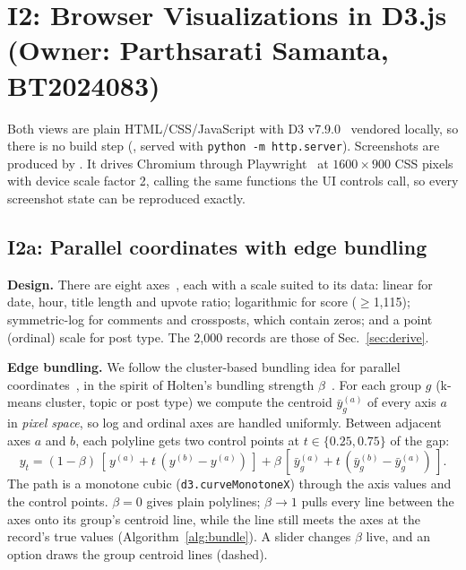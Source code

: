 \section{I2: Browser Visualizations in D3.js (Owner: Parthsarati Samanta, BT2024083)}
\label{sec:i2}
Both views are plain HTML/CSS/JavaScript with D3 v7.9.0~\cite{bostock2011} vendored locally, so there is no build step
(, served with \texttt{python -m http.server}). Screenshots are produced by
. It drives Chromium through Playwright~\cite{playwright} at $1600\times900$ CSS pixels with device
scale factor 2, calling the same functions the UI controls call, so every screenshot state can be reproduced exactly.

\subsection{I2a: Parallel coordinates with edge bundling}
\textbf{Design.} There are eight axes~\cite{inselberg1985}, each with a scale suited to its data: linear for date, hour,
title length and upvote ratio; logarithmic for score ($\ge$1,115); symmetric-log for comments and crossposts, which contain
zeros; and a point (ordinal) scale for post type. The 2,000 records are those of Sec.~\ref{sec:derive}.

\textbf{Edge bundling.} We follow the cluster-based bundling idea for parallel coordinates~\cite{zhou2008,heinrich2013},
in the spirit of Holten's bundling strength $\beta$~\cite{holten2006}. For each group $g$ (k-means cluster, topic or post
type) we compute the centroid $\bar y_g^{(a)}$ of every axis $a$ in \emph{pixel space}, so log and ordinal axes are handled
uniformly. Between adjacent axes $a$ and $b$, each polyline gets two control points at $t\in\{0.25, 0.75\}$ of the gap:
\begin{equation}
y_t=(1-\beta)\,[\,y^{(a)}+t\,(y^{(b)}-y^{(a)})\,]+\beta\,[\,\bar y_g^{(a)}+t\,(\bar y_g^{(b)}-\bar y_g^{(a)})\,].
\end{equation}
The path is a monotone cubic (\texttt{d3.curveMonotoneX}) through the axis values and the control points. $\beta=0$ gives
plain polylines; $\beta\rightarrow1$ pulls every line between the axes onto its group's centroid line, while the line still
meets the axes at the record's true values (Algorithm~\ref{alg:bundle}). A slider changes $\beta$ live, and an option draws the
group centroid lines (dashed).

